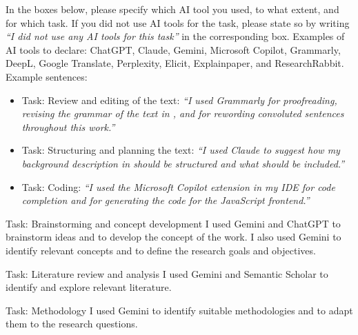 \documentclass[11pt]{article}
\begin{document}
In the boxes below, please specify which AI tool you used, to what extent, and for which task. If you did not use AI tools for the task, please state so by writing \textit{``I did not use any AI tools for this task''} in the corresponding box. Examples of AI tools to declare: ChatGPT, Claude, Gemini, Microsoft Copilot, Grammarly, DeepL, Google Translate, Perplexity, Elicit, Explainpaper, and ResearchRabbit. Example sentences:

\begin{itemize}
    \item Task: Review and editing of the text: \textit{``I used Grammarly for proofreading, revising the grammar of the text in , and for rewording convoluted sentences throughout this work.''}
    \item Task: Structuring and planning the text: \textit{``I used Claude to suggest how my background description in  should be structured and what should be included.''}
    \item Task: Coding: \textit{``I used the Microsoft Copilot extension in my IDE for code completion and for generating the code for the JavaScript frontend.''}
\end{itemize}

\vspace{.25em}

\begin{answerbox}{Task: Brainstorming and concept development}
    I used Gemini and ChatGPT to brainstorm ideas and to develop the concept of the work. I also used Gemini to identify relevant concepts and to define the research goals and objectives.
\end{answerbox}

\vspace{.25em}

\begin{answerbox}{Task: Literature review and analysis}
    I used Gemini and Semantic Scholar to identify and explore relevant literature.
\end{answerbox}

\vspace{.25em}

\begin{answerbox}{Task: Methodology}
    I used Gemini to identify suitable methodologies and to adapt them to the research questions.
\end{answerbox}
\end{document}

